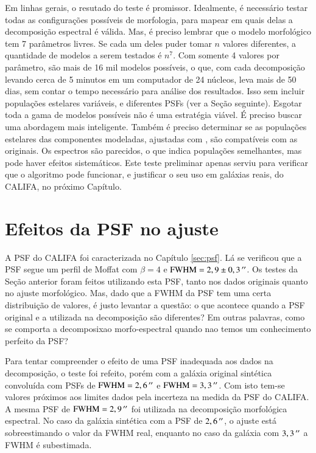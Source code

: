 
Em linhas gerais, o resutado do teste é promissor. Idealmente, é necessário
testar todas as configurações possíveis de morfologia, para mapear em quais
delas a decomposição espectral é válida. Mas, é preciso lembrar que o modelo
morfológico tem 7 parâmetros livres. Se cada um deles puder tomar $n$ valores
diferentes, a quantidade de modelos a serem testados é $n^7$. Com somente 4
valores por parâmetro, são mais de 16 mil modelos possíveis, o que, com cada
decomposição levando cerca de 5 minutos em um computador de 24 núcleos, leva
mais de 50 dias, sem contar o tempo necessário para análise dos resultados. Isso
sem incluir populações estelares variáveis, e diferentes PSFs (ver a Seção
seguinte). Esgotar toda a gama de modelos possíveis não é uma estratégia viável.
É preciso buscar uma abordagem mais inteligente. Também é preciso determinar se
as populações estelares das componentes modeladas, ajustadas com \starlight, são
compatíveis com as originais. Os espectros são parecidos, o que indica
populações semelhantes, mas pode haver efeitos sistemáticos. Este teste
preliminar apenas serviu para verificar que o algoritmo pode funcionar, e
justificar o seu uso em galáxias reais, do CALIFA, no próximo Capítulo.

\section{Efeitos da PSF no ajuste}
\label{sec:test:psf}

A PSF do CALIFA foi caracterizada no Capítulo \ref{sec:psf}. Lá se verificou que
a PSF segue um perfil de Moffat com $\beta=4$ e $\mathrm{FWHM} = 2,9 \pm
0,3\,^{\prime\prime}$. Os testes da Seção anterior foram feitos utilizando esta PSF, tanto
nos dados originais quanto no ajuste morfológico. Mas, dado que a FWHM da PSF
tem uma certa distribuição de valores, é justo levantar a questão: o que
acontece quando a PSF original e a utilizada na decomposição são diferentes? Em
outras palavras, como se comporta a decomposixao morfo-espectral quando nao
temos um conhecimento perfeito da PSF?

Para tentar compreender o efeito de uma PSF inadequada aos dados na
decomposição, o teste foi refeito, porém com a galáxia original sintética
convoluída com PSFs de $\mathrm{FWHM} = 2,6\,^{\prime\prime}$ e $\mathrm{FWHM} =
3,3\,^{\prime\prime}$. Com isto tem-se valores próximos aos limites dados pela incerteza
na medida da PSF do CALIFA. A mesma PSF de $\mathrm{FWHM} = 2,9\,^{\prime\prime}$ foi
utilizada na decomposição morfológica espectral. No caso da galáxia sintética
com a PSF de $2,6\,^{\prime\prime}$, o ajuste está sobreestimando o valor da FWHM real,
enquanto no caso da galáxia com $3,3\,^{\prime\prime}$ a FWHM é subestimada.

